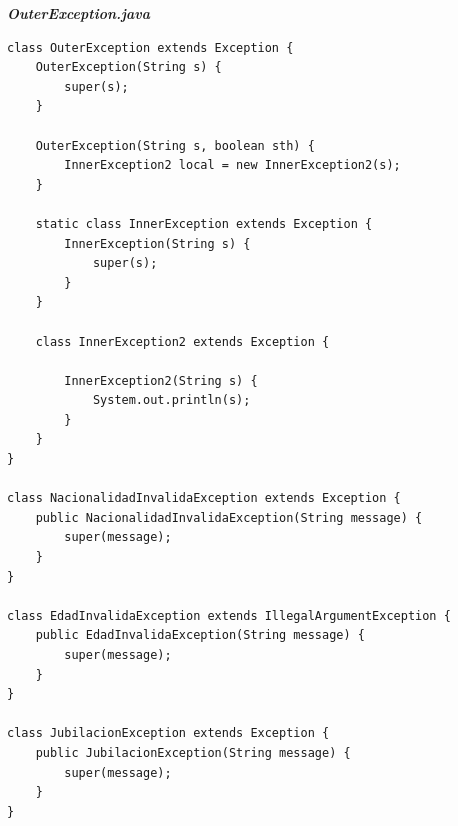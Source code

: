 \documentclass[11pt, twocolumn]{article}
\begin{document}
  \textbf{\textit{OuterException.java}}
  \begin{lstlisting}
class OuterException extends Exception {
	OuterException(String s) {
		super(s);
	}

	OuterException(String s, boolean sth) {
		InnerException2 local = new InnerException2(s);
	}

	static class InnerException extends Exception {
		InnerException(String s) {
			super(s);
		}
	}

	class InnerException2 extends Exception {

		InnerException2(String s) {
			System.out.println(s);
		}
	}
}

class NacionalidadInvalidaException extends Exception {
	public NacionalidadInvalidaException(String message) {
		super(message);
	}
}

class EdadInvalidaException extends IllegalArgumentException {
	public EdadInvalidaException(String message) {
		super(message);
	}
}

class JubilacionException extends Exception {
	public JubilacionException(String message) {
		super(message);
	}
}
  \end{lstlisting} 
\end{document}
